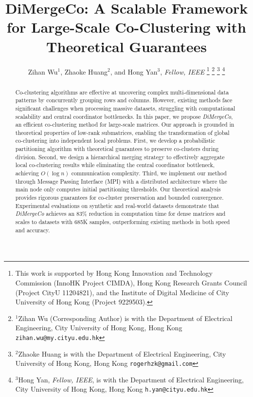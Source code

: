 \documentclass[journal]{IEEEtran}
\begin{document}
\title{\LARGE \bf DiMergeCo: A Scalable Framework for Large-Scale Co-Clustering with Theoretical Guarantees}


\author{Zihan Wu$^{1}$, Zhaoke Huang$^{2}$, and Hong Yan$^{3}$, \textit{Fellow, IEEE}%
    \thanks{This work is supported by Hong Kong Innovation and
        Technology Commission (InnoHK Project CIMDA), Hong
        Kong Research Grants Council (Project CityU 11204821), and the Institute of Digital Medicine of City University of Hong Kong (Project 9229503). }%
    \thanks{$^{1}$Zihan Wu (Corresponding Author) is with the Department of Electrical Engineering,
        City University of Hong Kong, Hong Kong
            {\tt\small zihan.wu@my.cityu.edu.hk}}%
    \thanks{$^{2}$Zhaoke Huang is with the Department of Electrical Engineering,
        City University of Hong Kong, Hong Kong
            {\tt\small rogerhzk@gmail.com}}%
    \thanks{$^{3}$Hong Yan, \textit{Fellow, IEEE}, is with the Department of Electrical Engineering,
        City University of Hong Kong, Hong Kong
            {\tt\small h.yan@cityu.edu.hk}}%
}
\maketitle

\begin{abstract}
    Co-clustering algorithms are effective at uncovering complex multi-dimensional data patterns by concurrently grouping rows and columns. However, existing methods face significant challenges when processing massive datasets, struggling with computational scalability and central coordinator bottlenecks. In this paper, we propose \emph{DiMergeCo}, an efficient co-clustering method for large-scale matrices. Our approach is grounded in theoretical properties of low-rank submatrices, enabling the transformation of global co-clustering into independent local problems.  First, we develop a probabilistic partitioning algorithm with theoretical guarantees to preserve co-clusters during division. Second, we design a hierarchical merging strategy to effectively aggregate local co-clustering results while eliminating the central coordinator bottleneck, achieving $O(\log n)$ communication complexity. Third, we implement our method through Message Passing Interface (MPI) with a distributed architecture where the main node only computes initial partitioning thresholds.
    Our theoretical analysis provides rigorous guarantees for co-cluster preservation and bounded convergence. Experimental evaluations on synthetic and real-world datasets demonstrate that \emph{DiMergeCo} achieves an 83\% reduction in computation time for dense matrices and scales to datasets with 685K samples, outperforming existing methods in both speed and accuracy.
\end{abstract}
\end{document}
